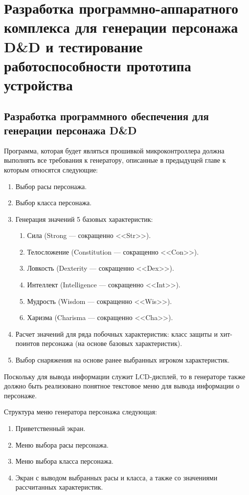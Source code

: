 \chapter{Разработка программно-аппаратного комплекса для генерации персонажа D\&D и тестирование работоспособности прототипа устройства}

\section{Разработка программного обеспечения для генерации персонажа D\&D}

Программа, которая будет являться прошивкой микроконтроллера должна выполнять все требования к генератору, описанные в предыдущей главе к которым относятся следующие:

\begin{enumerate}
    \item Выбор расы персонажа.
    \item Выбор класса персонажа.
    \item Генерация значений 5 базовых характеристик:
    \begin{enumerate}
        \item Сила (Strong --- сокращенно <<Str>>).
        \item Телосложение (Constitution --- сокращенно <<Con>>).
        \item Ловкость (Dexterity --- сокращенно <<Dex>>).
        \item Интеллект (Intelligence --- сокращенно <<Int>>).
        \item Мудрость (Wisdom --- сокращенно <<Wis>>).
        \item Харизма (Charisma --- сокращенно <<Cha>>).
    \end{enumerate}
    \item Расчет значений для ряда побочных характеристик: класс защиты и хит-поинтов персонажа (на основе базовых характеристик).
    \item Выбор снаряжения на основе ранее выбранных игроком характеристик.
\end{enumerate}

Поскольку для вывода информации служит LCD-дисплей, то в генераторе также должно быть реализовано понятное текстовое меню для вывода информации о персонаже. 

Структура меню генератора персонажа следующая:

\begin{enumerate}
    \item Приветственный экран.
    \item Меню выбора расы персонажа.
    \item Меню выбора класса персонажа.
    \item Экран с выводом выбранных расы и класса, а также со значениями рассчитанных характеристик.
\end{enumerate}

